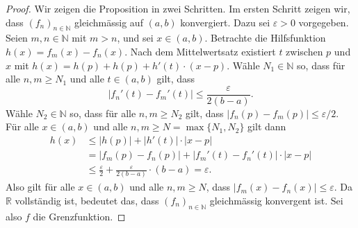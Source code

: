 \documentclass[../main.tex]{subfiles}
\begin{document}
\begin{proof}
  Wir zeigen die Proposition in zwei Schritten. Im ersten Schritt zeigen wir,
  dass ${(f_{n})}_{n \in \mathbb{N}}$ gleichmässig auf $(a, b)$ konvergiert.
  Dazu sei $\varepsilon > 0$ vorgegeben. Seien $m, n \in \mathbb{N}$ 
  mit $m > n$, und sei $x \in (a, b)$.
  Betrachte die Hilfsfunktion
  \(
    h(x) = f_m(x) - f_n(x)
  \).
  Nach dem Mittelwertsatz existiert $ t$ zwischen $p$ und $x$ mit
  $h(x) = h(p) + h(p) + h'(t) \cdot (x - p)$.
  Wähle $N_1 \in \mathbb{N}$ so, dass für alle $n , m \geq N_1$ und
  alle $t \in (a, b)$ gilt, dass
  \[
  |f_n'(t) - f_m'(t)| \leq \frac{\varepsilon }{2(b-a)}.
  \]
  Wähle $N_2 \in \mathbb{N}$ so, dass für alle $n , m \geq N_2$ gilt,
  dass
  \(
    |f_n(p) - f_m(p)| \leq \varepsilon/2
  \).
  Für alle $x \in (a, b)$ und alle $n, m \geq N = \max\{N_1, N_2\}$ gilt dann
   \begin{align*}
     h(x) 
     &\leq |h(p)| + |h'(t)| \cdot |x - p|  \\
     &= |f_m(p) - f_n(p)| + |f_m'(t) - f_n'(t)| \cdot |x - p| \\
     & \leq \frac{\varepsilon}{2} + \frac{\varepsilon}{2(b-a)}\cdot (b-a) = \varepsilon.
  \end{align*}
  Also gilt für alle $x \in (a, b)$ und alle $n, m \geq N$, dass
  $|f_m(x) - f_n(x)| \leq \varepsilon$. Da $\mathbb{R}$ vollständig ist,
  bedeutet das, dass ${(f_{n})}_{n \in \mathbb{N}}$ gleichmässig konvergent ist.
  Sei also $f$ die Grenzfunktion.
  

\end{proof}
\end{document}
